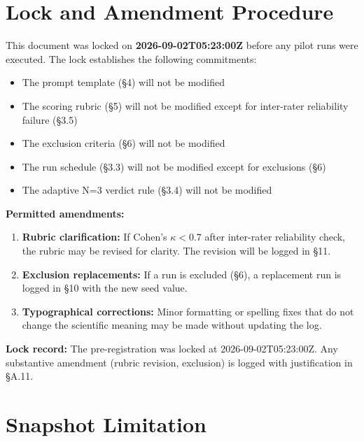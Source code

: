 
\section{Lock and Amendment Procedure}

This document was locked on \textbf{2026-09-02T05:23:00Z} before any pilot runs were executed. The lock establishes the following commitments:

\begin{itemize}
\item The prompt template (§4) will not be modified
\item The scoring rubric (§5) will not be modified except for inter-rater reliability failure (§3.5)
\item The exclusion criteria (§6) will not be modified
\item The run schedule (§3.3) will not be modified except for exclusions (§6)
\item The adaptive N=3 verdict rule (§3.4) will not be modified
\end{itemize}

\textbf{Permitted amendments:}
\begin{enumerate}
\item \textbf{Rubric clarification:} If Cohen's $\kappa < 0.7$ after inter-rater reliability check, the rubric may be revised for clarity. The revision will be logged in §11.
\item \textbf{Exclusion replacements:} If a run is excluded (§6), a replacement run is logged in §10 with the new seed value.
\item \textbf{Typographical corrections:} Minor formatting or spelling fixes that do not change the scientific meaning may be made without updating the log.
\end{enumerate}

\textbf{Lock record:} The pre-registration was locked at 2026-09-02T05:23:00Z. Any substantive amendment (rubric revision, exclusion) is logged with justification in §A.11.


\section{Snapshot Limitation}

